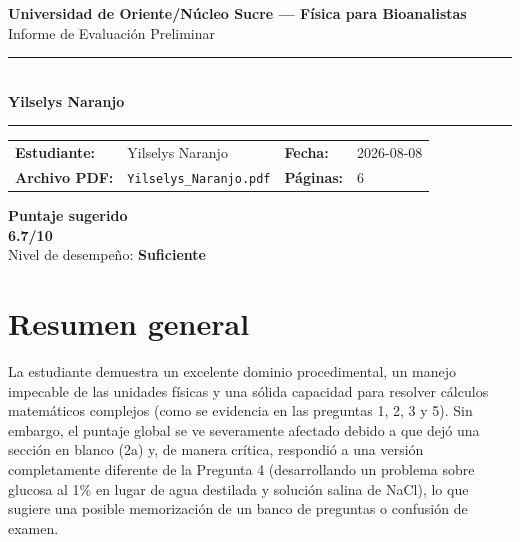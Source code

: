 \documentclass[11pt,a4paper]{article}
\begin{document}
\begin{center}
  {\Large\bfseries\color{azulTitulo} Universidad de Oriente/Núcleo Sucre --- Física para Bioanalistas}\\[4pt]
  {\large Informe de Evaluación Preliminar}\\[12pt]
  \rule{\linewidth}{1.2pt}\\[6pt]
  {\LARGE\bfseries Yilselys Naranjo}\\[4pt]
  \rule{\linewidth}{0.6pt}
\end{center}

\vspace{4pt}
\begin{tcolorbox}[cajaTitulo, title=Datos del informe]
\begin{tabular}{@{}llll@{}}
  \textbf{Estudiante:}  & Yilselys Naranjo  &
  \textbf{Fecha:}       & 2026-08-08 \\[4pt]
  \textbf{Archivo PDF:} & \texttt{Yilselys\_Naranjo.pdf}  &
  \textbf{Páginas:}     & 6 \\
\end{tabular}
\end{tcolorbox}

\vspace{6pt}
\begin{center}
  \begin{tcolorbox}[
    enhanced,
    colback=white, colframe=desempeno_suficiente,
    width=0.62\linewidth,
    boxrule=2pt,
    halign=center, valign=center,
    top=8pt, bottom=8pt,
  ]
    \centering
    {\large\bfseries Puntaje sugerido}\\[6pt]
    {\Huge\bfseries\color{desempeno_suficiente} 6.7/10}\\[6pt]
    {\large Nivel de desempeño: \textbf{\color{desempeno_suficiente} Suficiente}}
  \end{tcolorbox}
\end{center}

\section*{Resumen general}
La estudiante demuestra un excelente dominio procedimental, un manejo impecable de las unidades físicas y una sólida capacidad para resolver cálculos matemáticos complejos (como se evidencia en las preguntas 1, 2, 3 y 5). Sin embargo, el puntaje global se ve severamente afectado debido a que dejó una sección en blanco (2a) y, de manera crítica, respondió a una versión completamente diferente de la Pregunta 4 (desarrollando un problema sobre glucosa al 1\% en lugar de agua destilada y solución salina de NaCl), lo que sugiere una posible memorización de un banco de preguntas o confusión de examen.
\end{document}

